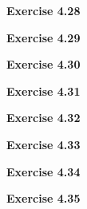 \documentclass{article}
\begin{document}
\bigskip

\begin{framed}
    \noindent \textbf{Exercise 4.28}
    
    \medskip
    
    
\end{framed}


\bigskip

\begin{framed}
    \noindent \textbf{Exercise 4.29}
    
    \medskip
    
    
\end{framed}


\bigskip

\begin{framed}
    \noindent \textbf{Exercise 4.30}
    
    \medskip
    
    
\end{framed}


\bigskip

\begin{framed}
    \noindent \textbf{Exercise 4.31}
    
    \medskip
    
    
\end{framed}


\bigskip

\begin{framed}
    \noindent \textbf{Exercise 4.32}
    
    \medskip
    
    
\end{framed}


\bigskip

\begin{framed}
    \noindent \textbf{Exercise 4.33}
    
    \medskip
    
    
\end{framed}


\bigskip

\begin{framed}
    \noindent \textbf{Exercise 4.34}
    
    \medskip
    
    
\end{framed}


\bigskip

\begin{framed}
    \noindent \textbf{Exercise 4.35}
    
    \medskip
    
    
\end{framed}
\end{document}
